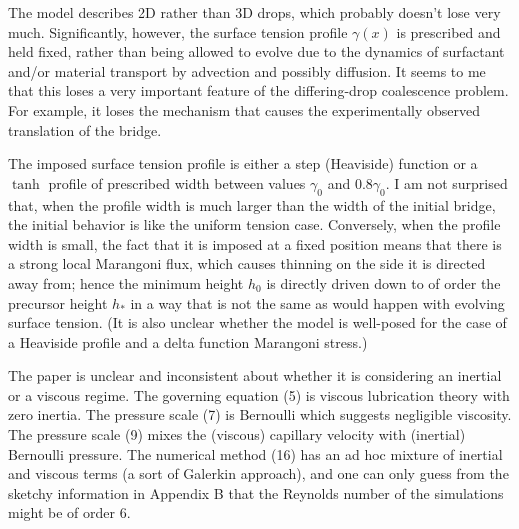 \documentclass[12pt,english]{article}
\begin{document}
\begin{itemize}


\item[ \textbf{\underline{Comment 1.}}]
{
The model describes 2D rather than 3D drops, which probably doesn't lose very much. 
Significantly, however, the surface tension profile $\gamma(x)$ is prescribed and held fixed, rather than being allowed to evolve due to the dynamics of surfactant and/or material transport by advection and possibly diffusion. 
It seems to me that this loses a very important feature of the differing-drop coalescence problem. 
For example, it loses the mechanism that causes the experimentally observed translation of the bridge.

\item[ \textbf{Answer}]
{

}

\item[ \textbf{\underline{Comment 2.}}]
The imposed surface tension profile is either a step (Heaviside) function or a $\tanh$ profile of prescribed width between values $\gamma_0$ and $0.8\gamma_0$. 
I am not surprised that, when the profile width is much larger than the width of the initial bridge, the initial behavior is like the uniform tension case. 
Conversely, when the profile width is small, the fact that it is imposed at a fixed position means that there is a strong local Marangoni flux, which causes thinning on the side it is directed away from; hence the minimum height $h_0$ is directly driven down to of order the precursor height $h_*$ in a way that is not the same as would happen with evolving surface tension. 
(It is also unclear whether the model is well-posed for the case of a Heaviside profile and a delta function Marangoni stress.)
}

\item[ \textbf{Answer}]
{

}

\item[ \textbf{\underline{Comment 3.}}]
{
The paper is unclear and inconsistent about whether it is considering an inertial or a viscous regime. 
The governing equation (5) is viscous lubrication theory with zero inertia. 
The pressure scale (7) is Bernoulli which suggests negligible viscosity. 
The pressure scale (9) mixes the (viscous) capillary velocity with (inertial) Bernoulli pressure. 
The numerical method (16) has an ad hoc mixture of inertial and viscous terms (a sort of Galerkin approach), and one can only guess from the sketchy information in Appendix B that the Reynolds number of the simulations might be of order 6.
}


\end{itemize}
\end{document}
